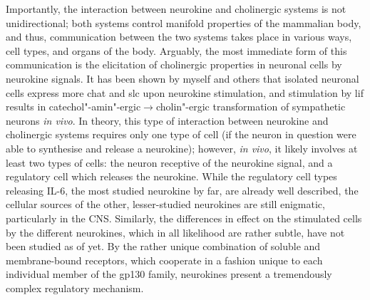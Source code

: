 Importantly, the interaction between neurokine and cholinergic systems is not unidirectional; both systems control manifold properties of the mammalian body, and thus, communication between the two systems takes place in various ways, cell types, and organs of the body. Arguably, the most immediate form of this communication is the elicitation of cholinergic properties in neuronal cells by neurokine signals. It has been shown by myself and others that isolated neuronal cells express more \acf{chat} and \acf{slc} upon neurokine stimulation,\cite{} and stimulation by \acf{lif} results in catechol"-amin"-ergic$\to$cholin"-ergic transformation of sympathetic neurons \emph{in vivo}.\cite{} In theory, this type of interaction between neurokine and cholinergic systems requires only one type of cell (if the neuron in question were able to synthesise and release a neurokine); however, \emph{in vivo}, it likely involves at least two types of cells: the neuron receptive of the neurokine signal, and a regulatory cell which releases the neurokine. While the regulatory cell types releasing IL-6, the most studied neurokine by far, are already well described, the cellular sources of the other, lesser-studied neurokines are still enigmatic, particularly in the CNS. Similarly, the differences in effect on the stimulated cells by the different neurokines, which in all likelihood are rather subtle, have not been studied as of yet. By the rather unique combination of soluble and membrane-bound receptors, which cooperate in a fashion unique to each individual member of the gp130 family, neurokines present a tremendously complex regulatory mechanism.

